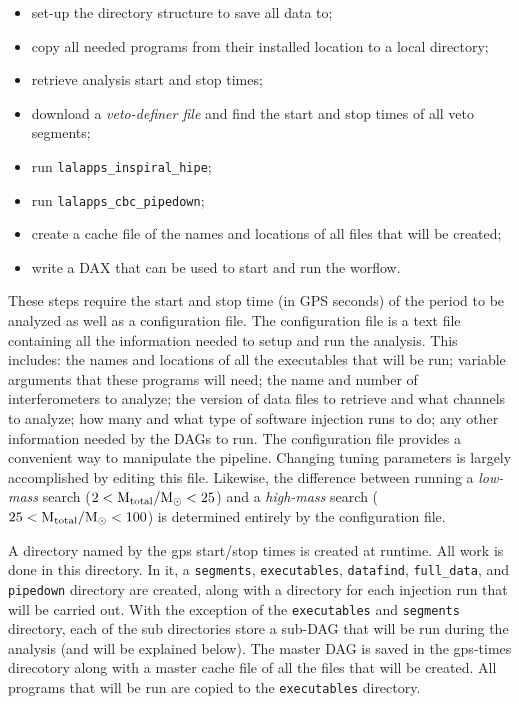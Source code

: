 \begin{itemize}
\item{set-up the directory structure to save all data to;}
\item{copy all needed programs from their installed location to a local directory;}
\item{retrieve analysis start and stop times;}
\item{download a {\it veto-definer file} and find the start and stop times of all veto segments;}
\item{run \texttt{lalapps\_inspiral\_hipe};}
\item{run \texttt{lalapps\_cbc\_pipedown};}
\item{create a cache file of the names and locations of all files that will be created;}
\item{write a DAX that can be used to start and run the worflow.}
\end{itemize}

These steps require the start and stop time (in GPS seconds) of the period to
be analyzed as well as a configuration file. The configuration file is a text
file containing all the information needed to setup and run the analysis. This
includes: the names and locations of all the executables that will be run;
variable arguments that these programs will need; the name and number of
interferometers to analyze; the version of data files to retrieve and what
channels to analyze; how many and what type of software injection runs to do;
any other information needed by the \ac{DAG}s to run. The configuration file
provides a convenient way to manipulate the pipeline. Changing tuning
parameters is largely accomplished by editing this file. Likewise, the
difference between running a {\it low-mass} search ($2 < \mathrm{M_{total}}/\mathrm{M_\odot} < 25$)
and a {\it high-mass} search ($25 < \mathrm{M_{total}}/\mathrm{M_\odot} < 100$) is determined
entirely by the configuration file.

A directory named by the gps start/stop times is created at runtime. All work
is done in this directory. In it, a \texttt{segments}, \texttt{executables},
\texttt{datafind}, \texttt{full\_data}, and \texttt{pipedown} directory are
created, along with a directory for each injection run that will be carried
out. With the exception of the \texttt{executables} and \texttt{segments}
directory, each of the sub directories store a sub-\ac{DAG} that will be run
during the analysis (and will be explained below). The master \ac{DAG} is saved
in the gps-times direcotory along with a master cache file of all the files
that will be created. All programs that will be run are copied to the
\texttt{executables} directory.

